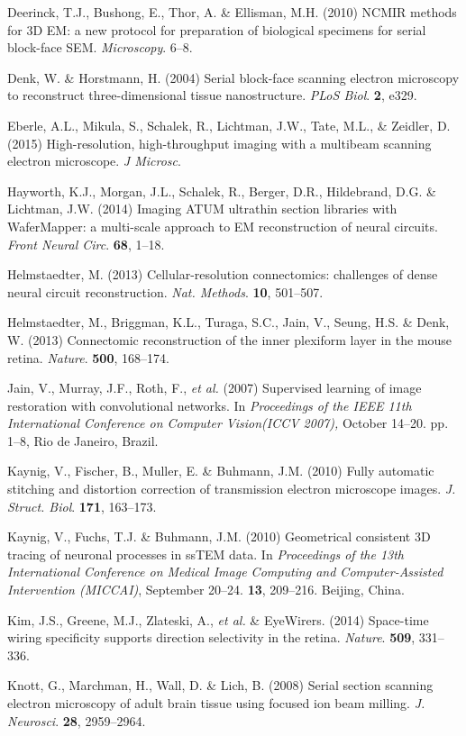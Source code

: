 \documentclass{article}
\begin{document}
\begin{hangpars}
Deerinck, T.J., Bushong, E., Thor, A. \& Ellisman, M.H. (2010) NCMIR methods for 3D EM: a new protocol for preparation of biological specimens for serial block-face SEM. \emph{Microscopy}. 6–8.

Denk, W. \& Horstmann, H. (2004) Serial block-face scanning electron microscopy to reconstruct three-dimensional tissue nanostructure. \emph{PLoS Biol}. \textbf{2}, e329.

Eberle, A.L., Mikula, S., Schalek, R., Lichtman, J.W., Tate, M.L., \& Zeidler, D. (2015) High-resolution, high-throughput imaging with a multibeam scanning electron microscope. \emph{J Microsc}.

Hayworth, K.J., Morgan, J.L., Schalek, R., Berger, D.R., Hildebrand, D.G. \& Lichtman, J.W. (2014) Imaging ATUM ultrathin section libraries with WaferMapper: a multi-scale approach to EM reconstruction of neural circuits. \emph{Front Neural Circ}. \textbf{68}, 1–18.

Helmstaedter, M. (2013) Cellular-resolution connectomics: challenges of dense neural circuit reconstruction. \emph{Nat. Methods}. \textbf{10}, 501–507.

Helmstaedter, M., Briggman, K.L., Turaga, S.C., Jain, V., Seung, H.S. \& Denk, W. (2013) Connectomic reconstruction of the inner plexiform layer in the mouse retina. \emph{Nature}. \textbf{500}, 168–174.

Jain, V., Murray, J.F., Roth, F., \emph{et al.} (2007) Supervised learning of image restoration with convolutional networks. In \emph{Proceedings of the IEEE 11th International Conference on Computer Vision(ICCV 2007),} October 14–20. pp. 1–8, Rio de Janeiro, Brazil.

Kaynig, V., Fischer, B., Muller, E. \& Buhmann, J.M. (2010) Fully automatic stitching and distortion correction of transmission electron microscope images. \emph{J. Struct. Biol}. \textbf{171}, 163–173.

Kaynig, V., Fuchs, T.J. \& Buhmann, J.M. (2010) Geometrical consistent 3D tracing of neuronal processes in ssTEM data. In \emph{Proceedings of the 13th International Conference on Medical Image Computing and Computer-Assisted Intervention (MICCAI)}, September 20–24. \textbf{13}, 209–216. Beijing, China.

Kim, J.S., Greene, M.J., Zlateski, A., \emph{et al.} \& EyeWirers. (2014) Space-time wiring specificity supports direction selectivity in the retina. \emph{Nature}. \textbf{509}, 331–336.

Knott, G., Marchman, H., Wall, D. \& Lich, B. (2008) Serial section scanning electron microscopy of adult brain tissue using focused ion beam milling. \emph{J. Neurosci}. \textbf{28}, 2959–2964.


\end{hangpars}
\end{document}

